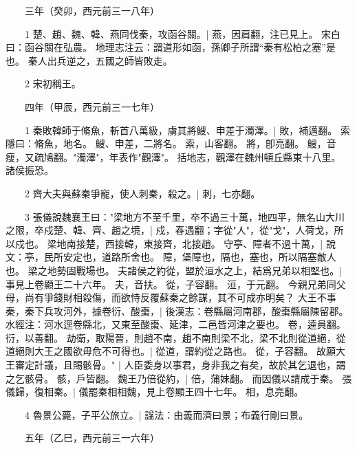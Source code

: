 　　三年（癸卯，西元前三一八年）

　　1 楚、趙、魏、韓、燕同伐秦，攻函谷關。|{
	燕，因肩翻，注已見上。
	宋白曰：函谷關在弘農。
	地理志注云：謂道形如函，孫卿子所謂“秦有松柏之塞”是也。
}
秦人出兵逆之，五國之師皆敗走。


　　2 宋初稱王。


　　四年（甲辰，西元前三一七年）

　　1 秦敗韓師于脩魚，斬首八萬級，虜其將䱸、申差于濁澤。|{
	敗，補邁翻。
	索隱曰：脩魚，地名。
	䱸、申差，二將名。
	索，山客翻。
	將，卽亮翻。
	䱸，音瘦，又疏鳩翻。"濁澤"，年表作"觀澤"。
	括地志，觀澤在魏州頓丘縣東十八里。
}
諸侯振恐。


　　2 齊大夫與蘇秦爭寵，使人刺秦，殺之。|{
	刺，七亦翻。
}

　　3 張儀說魏襄王曰："梁地方不至千里，卒不過三十萬，地四平，無名山大川之限，卒戍楚、韓、齊、趙之境，|{
	戍，舂遇翻；字從"人"，從"戈"，人荷戈，所以戍也。
	梁地南接楚，西接韓，東接齊，北接趙。
}
守亭、障者不過十萬，|{
	說文：亭，民所安定也，道路所舍也。
	障，堡障也，隔也，塞也，所以隔塞敵人也。
}
梁之地勢固戰場也。
	夫諸侯之約從，盟於洹水之上，結爲兄弟以相堅也。|{
	事見上卷顯王二十六年。
	夫，音扶。
	從，子容翻。
	洹，于元翻。
}
今親兄弟同父母，尚有爭錢財相殺傷，而欲恃反覆蘇秦之餘謀，其不可成亦明矣？
大王不事秦，秦下兵攻河外，據卷衍、酸棗，|{
	後漢志：卷縣屬河南郡，酸棗縣屬陳留郡。
	水經注：河水逕卷縣北，又東至酸棗、延津，二邑皆河津之要也。
	卷，逵員翻。
	衍，以善翻。
}
劫衛，取陽晉，則趙不南，趙不南則梁不北，梁不北則從道絕，從道絕則大王之國欲毋危不可得也。|{
	從道，謂約從之路也。
	從，子容翻。
}
故願大王審定計議，且賜骸骨。" |{
	人臣委身以事君，身非我之有矣，故於其乞退也，謂之乞骸骨。
	骸，戶皆翻。
}
魏王乃倍從約，|{
	倍，蒲妹翻。
}
而因儀以請成于秦。
	張儀歸，復相秦。|{
	儀罷秦相相魏，見上卷顯王四十七年。
	相，息亮翻。
}

　　4 魯景公薨，子平公旅立。|{
	諡法：由義而濟曰景；布義行剛曰景。
}

　　五年（乙巳，西元前三一六年）

